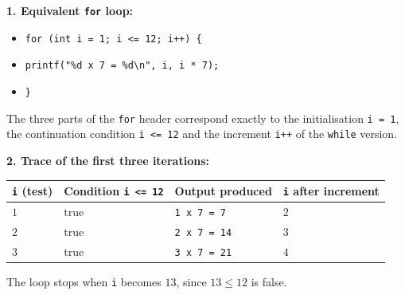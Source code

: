 \documentclass[11pt]{article}
\begin{document}
\begin{corrige}
\textbf{1. Equivalent \texttt{for} loop:}
\begin{itemize}
\item \texttt{for (int i = 1; i <= 12; i++) \{}
\item \texttt{\quad printf("\%d x 7 = \%d\textbackslash n", i, i * 7);}
\item \texttt{\}}
\end{itemize}
The three parts of the \texttt{for} header correspond exactly to the initialisation \texttt{i = 1}, the continuation condition \texttt{i <= 12} and the increment \texttt{i++} of the \texttt{while} version.

\textbf{2. Trace of the first three iterations:}
\begin{center}
\begin{tabularx}{\linewidth}{|l|X|X|X|}
\hline
\rowcolor{popblueL} \texttt{i} (test) & Condition \texttt{i <= 12} & Output produced & \texttt{i} after increment \\
\hline
$1$ & true & \texttt{1 x 7 = 7} & $2$ \\
\hline
$2$ & true & \texttt{2 x 7 = 14} & $3$ \\
\hline
$3$ & true & \texttt{3 x 7 = 21} & $4$ \\
\hline
\end{tabularx}
\end{center}
The loop stops when \texttt{i} becomes $13$, since $13 \le 12$ is false.
\end{corrige}
\end{document}
